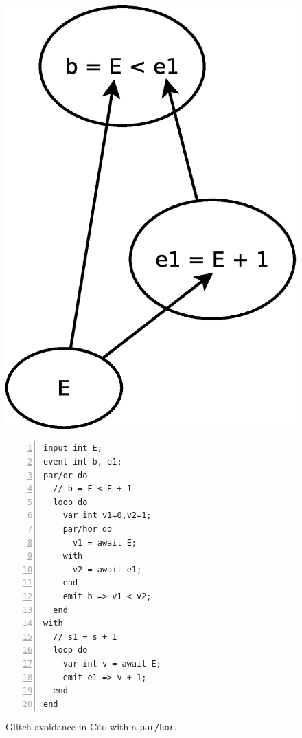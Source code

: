 \documentclass{acm_proc_article-sp}
\newcommand{\CEU}{\textsc{C\'{e}u}\xspace}
\newcommand{\code}[1] {{\small{\texttt{#1}}}}
\newcommand{\1}{\;}
\newcommand{\2}{\;\;}
\newcommand{\3}{\;\;\;}
\newcommand{\5}{\;\;\;\;\;}
\begin{document}
\begin{figure}[t]
\begin{minipage}[t]{0.34\linewidth}
\vspace{30pt}
\hspace{0.0cm}
\includegraphics[width=\textwidth]{s}
\hspace{0.0cm}
\end{minipage}
%
\begin{minipage}[t]{0.10\linewidth}
\hspace{0.4cm}
\end{minipage}
\begin{minipage}[t]{0.55\linewidth}
\begin{lstlisting}[numbers=left,xleftmargin=0em]
input int E;
event int b, e1;
par/or do
  // b = E < E + 1
  loop do
    var int v1=0,v2=1;
    par/hor do
      v1 = await E;
    with
      v2 = await e1;
    end
    emit b => v1 < v2;
  end
with
  // s1 = s + 1
  loop do
    var int v = await E;
    emit e1 => v + 1;
  end
end
\end{lstlisting}
\end{minipage}
\caption{ Glitch avoidance in \CEU with a \code{par/hor}.
\label{fig.glitch}
{\small
}
\label{lst.glitch}
}
\end{figure}
\end{document}
